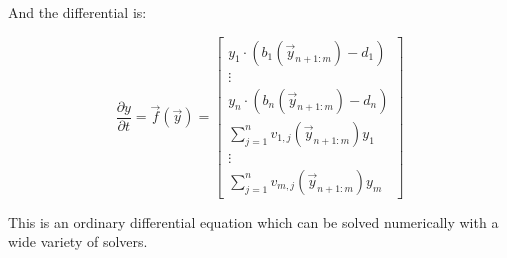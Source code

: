 \documentclass{scrartcl}
\let\v\vec
\let\mul\cdot
\begin{document}
	And the differential is:
	
	\begin{equation}
		\frac{\partial y}{\partial t} = \v f(\v y) = \left[
		\begin{matrix}
			y_1 \mul (b_1(\v y_{n+1:m}) - d_1)\\
			\vdots\\
			y_n \mul (b_n(\v y_{n+1:m}) - d_n)\\
			\sum_{j=1}^n v_{1,j}(\v y_{n+1:m}) y_1\\
			\vdots\\
			\sum_{j=1}^n v_{m,j}(\v y_{n+1:m}) y_m
		\end{matrix}
		\right]
	\end{equation}
	
	This is an ordinary differential equation which can be solved numerically with a wide variety of solvers.
\end{document}
